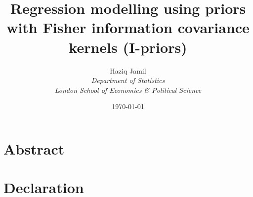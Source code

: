 \documentclass[a4paper,11pt,showframe]{report}
\begin{document}
\title{Regression modelling using priors with Fisher information covariance kernels (I-priors)}
\author{	Haziq Jamil\\
			\normalsize{\it{Department of Statistics}}\\
			\normalsize{\it{London School of Economics \& Political Science}}
}
\date{\normalsize\today}
\maketitle

\chapter*{Abstract} 
\chapter*{Declaration} 

\hTOCandLists
\clearpage

\end{document}
